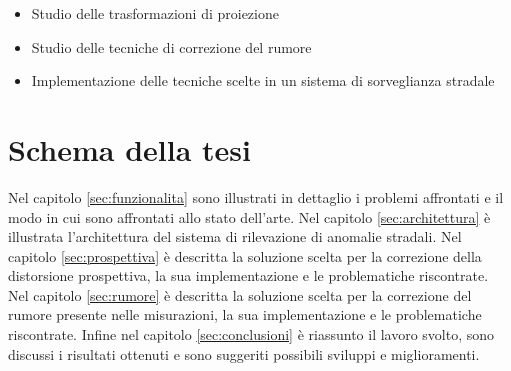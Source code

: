 \begin{itemize}
	\item Studio delle trasformazioni di proiezione
	\item Studio delle tecniche di correzione del rumore
	\item Implementazione delle tecniche scelte in un sistema di sorveglianza stradale
\end{itemize}

\section{Schema della tesi}

Nel capitolo \ref{sec:funzionalita} sono illustrati in dettaglio i problemi affrontati e il modo in cui sono affrontati allo stato dell'arte.
Nel capitolo \ref{sec:architettura} è illustrata l'architettura del sistema di rilevazione di anomalie stradali.
Nel capitolo \ref{sec:prospettiva} è descritta la soluzione scelta per la correzione della distorsione prospettiva, la sua implementazione e le problematiche riscontrate.
Nel capitolo \ref{sec:rumore} è descritta la soluzione scelta per la correzione del rumore presente nelle misurazioni, la sua implementazione e le problematiche riscontrate.
Infine nel capitolo \ref{sec:conclusioni} è riassunto il lavoro svolto, sono discussi i risultati ottenuti e sono suggeriti possibili sviluppi e miglioramenti.
